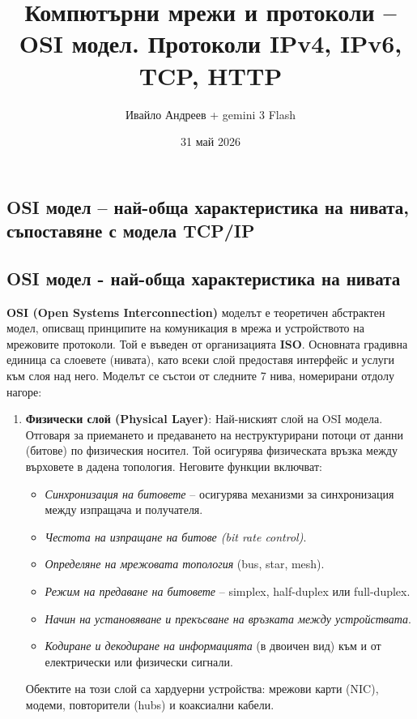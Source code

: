 \documentclass{scrartcl}
\title{Компютърни мрежи и протоколи – OSI модел. Протоколи IPv4, IPv6, TCP, HTTP}
\author{Ивайло Андреев + gemini 3 Flash}
\date{31 май 2026}
\begin{document}
\maketitle

\tableofcontents
\newpage

\begin{FlushLeft}

\section{OSI модел – най-обща характеристика на нивата, съпоставяне с модела TCP/IP}

\subsection{OSI модел - най-обща характеристика на нивата}
\textbf{OSI (Open Systems Interconnection)} моделът е теоретичен абстрактен модел, описващ принципите на комуникация в мрежа и устройството на мрежовите протоколи. Той е въведен от организацията \textbf{ISO}. Основната градивна единица са слоевете (нивата), като всеки слой предоставя интерфейс и услуги към слоя над него. Моделът се състои от следните 7 нива, номерирани отдолу нагоре:

\begin{enumerate}
    \item \textbf{Физически слой (Physical Layer)}: Най-ниският слой на OSI модела. Отговаря за приемането и предаването на неструктурирани потоци от данни (битове) по физическия носител. Той осигурява физическата връзка между върховете в дадена топология. Неговите функции включват:
    \begin{itemize}
        \item \textit{Синхронизация на битовете} – осигурява механизми за синхронизация между изпращача и получателя.
        \item \textit{Честота на изпращане на битове (bit rate control)}.
        \item \textit{Определяне на мрежовата топология} (bus, star, mesh).
        \item \textit{Режим на предаване на битовете} – simplex, half-duplex или full-duplex.
        \item \textit{Начин на установяване и прекъсване на връзката между устройствата}.
        \item \textit{Кодиране и декодиране на информацията} (в двоичен вид) към и от електрически или физически сигнали.
    \end{itemize}
    Обектите на този слой са хардуерни устройства: мрежови карти (NIC), модеми, повторители (hubs) и коаксиални кабели.


\end{enumerate}
\end{FlushLeft}
\end{document}
